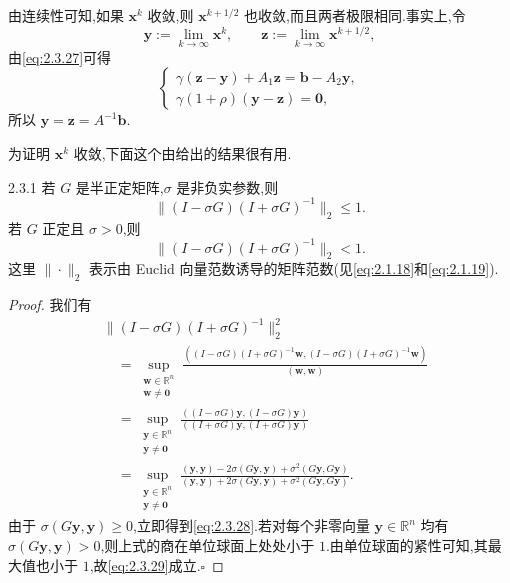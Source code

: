 由连续性可知,如果 \(\boldsymbol{x}^k\) 收敛,则 \(\boldsymbol{x}^{k+1/2}\) 也收敛,而且两者极限相同.事实上,令
\[
  \boldsymbol{y}:=\lim_{k\to\infty}\boldsymbol{x}^k,\qquad
  \boldsymbol{z}:=\lim_{k\to\infty}\boldsymbol{x}^{k+1/2},
\]
由\eqref{eq:2.3.27}可得
\[
  \begin{cases}
    \gamma(\boldsymbol{z}-\boldsymbol{y})+A_1\boldsymbol{z}=\boldsymbol{b}-A_2\boldsymbol{y},\\
    \gamma(1+\rho)(\boldsymbol{y}-\boldsymbol{z})=\boldsymbol{0},
  \end{cases}
\]
所以 \(\boldsymbol{y}=\boldsymbol{z}=A^{-1}\boldsymbol{b}\).

为证明 \(\boldsymbol{x}^k\) 收敛,下面这个由给出的结果很有用.

\begin{proposition}[Kellogg 引理]{2.3.1}
若 \(G\) 是半正定矩阵,\(\sigma\) 是非负实参数,则
\begin{equation}\label{eq:2.3.28}
  \|(I-\sigma G)(I+\sigma G)^{-1}\|_2\le1.
\end{equation}
若 \(G\) 正定且 \(\sigma>0\),则
\begin{equation}\label{eq:2.3.29}
  \|(I-\sigma G)(I+\sigma G)^{-1}\|_2<1.
\end{equation}
这里 \(\|\cdot\|_2\) 表示由 Euclid 向量范数诱导的矩阵范数(见\eqref{eq:2.1.18}和\eqref{eq:2.1.19}).
\end{proposition}

\begin{proof}
我们有
\[
  \begin{aligned}
    &\|(I-\sigma G)(I+\sigma G)^{-1}\|_2^2\\
    &\quad=\sup_{\substack{\boldsymbol{w}\in\mathbb R^n\\\boldsymbol{w}\ne\boldsymbol{0}}}
    \frac{((I-\sigma G)(I+\sigma G)^{-1}\boldsymbol{w},
          (I-\sigma G)(I+\sigma G)^{-1}\boldsymbol{w})}{(\boldsymbol{w},\boldsymbol{w})}\\
    &\quad=\sup_{\substack{\boldsymbol{y}\in\mathbb R^n\\\boldsymbol{y}\ne\boldsymbol{0}}}
    \frac{((I-\sigma G)\boldsymbol{y},(I-\sigma G)\boldsymbol{y})}
         {((I+\sigma G)\boldsymbol{y},(I+\sigma G)\boldsymbol{y})}\\
    &\quad=\sup_{\substack{\boldsymbol{y}\in\mathbb R^n\\\boldsymbol{y}\ne\boldsymbol{0}}}
    \frac{(\boldsymbol{y},\boldsymbol{y})-2\sigma(G\boldsymbol{y},\boldsymbol{y})+
          \sigma^2(G\boldsymbol{y},G\boldsymbol{y})}
         {(\boldsymbol{y},\boldsymbol{y})+2\sigma(G\boldsymbol{y},\boldsymbol{y})+
          \sigma^2(G\boldsymbol{y},G\boldsymbol{y})}.
  \end{aligned}
\]
由于 \(\sigma(G\boldsymbol{y},\boldsymbol{y})\ge0\),立即得到\eqref{eq:2.3.28}.若对每个非零向量 \(\boldsymbol{y}\in\mathbb R^n\) 均有 \(\sigma(G\boldsymbol{y},\boldsymbol{y})>0\),则上式的商在单位球面上处处小于 \(1\).由单位球面的紧性可知,其最大值也小于 \(1\),故\eqref{eq:2.3.29}成立.\hfill\(\square\)
\end{proof}

